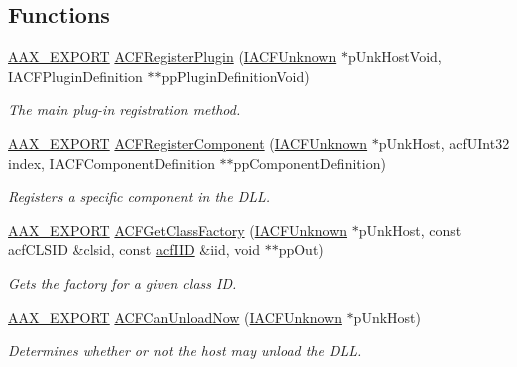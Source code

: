 \subsection*{Functions}
\begin{DoxyCompactItemize}
\item 
\hyperlink{a00209_ac70085d71c555deff0dfb54c2b503f4c}{A\+A\+X\+\_\+\+E\+X\+P\+O\+R\+T} \hyperlink{a00209_aa455fa4d9a2236334d0fd959b4919788}{A\+C\+F\+Register\+Plugin} (\hyperlink{a00146}{I\+A\+C\+F\+Unknown} $\ast$p\+Unk\+Host\+Void, I\+A\+C\+F\+Plugin\+Definition $\ast$$\ast$pp\+Plugin\+Definition\+Void)
\begin{DoxyCompactList}\small\item\em The main plug-\/in registration method. \end{DoxyCompactList}\item 
\hyperlink{a00209_ac70085d71c555deff0dfb54c2b503f4c}{A\+A\+X\+\_\+\+E\+X\+P\+O\+R\+T} \hyperlink{a00209_a68950ea83fea9b46b8f3fef409355b71}{A\+C\+F\+Register\+Component} (\hyperlink{a00146}{I\+A\+C\+F\+Unknown} $\ast$p\+Unk\+Host, acf\+U\+Int32 index, I\+A\+C\+F\+Component\+Definition $\ast$$\ast$pp\+Component\+Definition)
\begin{DoxyCompactList}\small\item\em Registers a specific component in the D\+L\+L. \end{DoxyCompactList}\item 
\hyperlink{a00209_ac70085d71c555deff0dfb54c2b503f4c}{A\+A\+X\+\_\+\+E\+X\+P\+O\+R\+T} \hyperlink{a00209_a63cbe0222beee199dad20c26e79ebeaa}{A\+C\+F\+Get\+Class\+Factory} (\hyperlink{a00146}{I\+A\+C\+F\+Unknown} $\ast$p\+Unk\+Host, const acf\+C\+L\+S\+I\+D \&clsid, const \hyperlink{a00150_a59df0b41744eee7a066787aaedf97f67}{acf\+I\+I\+D} \&iid, void $\ast$$\ast$pp\+Out)
\begin{DoxyCompactList}\small\item\em Gets the factory for a given class I\+D. \end{DoxyCompactList}\item 
\hyperlink{a00209_ac70085d71c555deff0dfb54c2b503f4c}{A\+A\+X\+\_\+\+E\+X\+P\+O\+R\+T} \hyperlink{a00209_ae5327dbd8fd750c78eca3892831f4ad8}{A\+C\+F\+Can\+Unload\+Now} (\hyperlink{a00146}{I\+A\+C\+F\+Unknown} $\ast$p\+Unk\+Host)
\begin{DoxyCompactList}\small\item\em Determines whether or not the host may unload the D\+L\+L. \end{DoxyCompactList}\item 
$$
\end{DoxyCompactItemize}
